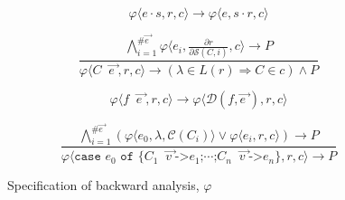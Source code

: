 \documentclass[book]{tfp05symp}
\newcommand{\T}[1]{\texttt{#1}}
\newcommand{\gap}{\;\;}
\newcommand{\tup}[1]{\ensuremath{\langle #1 \rangle}}
\newcommand{\D}{\ensuremath{\cdot}}
\newcommand{\vecto}[1]{\overrightarrow{#1\;}}
\begin{document}
\begin{figure}

\renewcommand\theequation{sel}
\begin{equation}
    \varphi\tup{e\D{}s,r,c} \rightarrow
    \varphi\tup{e,s\D{}r,c}
\end{equation}

\renewcommand\theequation{con}
\begin{equation}
\frac
    {
        \bigwedge_{i=1}^{\#\vecto{e}}
        \varphi\tup{e_i,\frac{\partial r}{\partial \mathcal{S}(C,i)},c}
        \rightarrow P
    }
    {
        \varphi\tup{C \gap \vecto{e},r,c}
        \rightarrow (\lambda \in L(r) \Rightarrow C \in c) \wedge P
    }
\end{equation}

\renewcommand\theequation{app}
\begin{equation}
    \varphi\tup{f \gap \vecto{e},r,c} \rightarrow
    \varphi\tup{\mathcal{D}(f, \vecto{e}),r,c}
\end{equation}

\renewcommand\theequation{cas}
\begin{equation}
\frac
    {
        \bigwedge_{i=1}^{\#\vecto{e}}
        (
            \varphi\tup{e_0,\lambda,\mathcal{C}(C_i)} \vee
            \varphi\tup{e_i,r,c}
        ) \rightarrow P
    }
    {
        \varphi\tup{\T{case } e_0 \T{ of \{}C_1 \gap \vecto{v} \T{->} e_1\T{;} \cdots
        \T{;} C_n \gap \vecto{v} \T{->} e_n \},r,c} \rightarrow P
    }
\end{equation}

\caption{Specification of backward analysis, $\varphi$} %
\label{fig:backward}
\end{figure}
\end{document}
